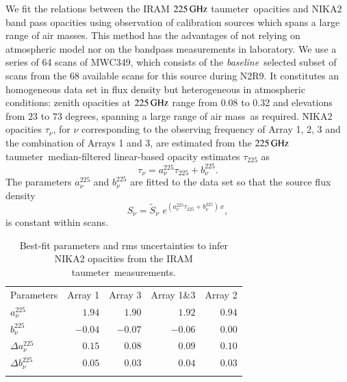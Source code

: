 \documentclass[traditionalabstract]{aa}
\newcommand{\baseline}{\emph{baseline}}
\newcommand{\taunu}{\tau_{\nu}}
\newcommand{\taumeter}{taumeter}
\newcommand{\airmass}{air mass}
\newcommand{\lp}[1]{#1}
\begin{document}
We fit the relations between the IRAM
$225\,\rm{GHz}$ \taumeter\ opacities and NIKA2 band pass opacities using
observation of calibration sources which spans a large range of air
masses. This method has the advantages of not relying on atmospheric
model nor on the bandpass measurements in laboratory.
We use a series of 64 scans of MWC349, which consists of the
\baseline\ selected subset of scans from the 68 available scans for
this source during N2R9.
It constitutes an homogeneous data set in flux density but
heterogeneous in atmospheric conditions: zenith opacities at
$225\,\rm{GHz}$ range from 0.08 to 0.32 and elevations from $23$ to $73$
degrees, spanning a large range of \airmass\ as required.
NIKA2 opacities $\taunu$, for $\nu$ corresponding to the observing
frequency of Array 1, 2, 3 and the combination of Arrays 1 and 3, are estimated
from the $225\,\rm{GHz}$ \taumeter\ median-filtered linear-based opacity
estimates $\tau_{225}$ as
\begin{equation}  
  \tau_\nu =  a_\nu^{225}\tau_{225} + b_\nu^{225}.
  \label{eq:taumeter_model}
\end{equation}
The parameters $a_\nu^{225}$ and $b_\nu^{225}$ are fitted
to the data set so that the source flux density 
\begin{equation}  
  S_\nu = \tilde{S}_\nu\,\, e^{(a_\nu^{225}\tau_{225} + b_\nu^{225}) \, x}, 
  \label{eq:opacorr_taumeter}
\end{equation}
is constant within scans.

\begin{table}[!htbp]
  \begin{center}
    \caption[IRAM \taumeter\ to NIKA2 opacity model]{{\lp Best-fit
    parameters and rms uncertainties to infer NIKA2 opacities from the IRAM \taumeter\ measurements.}}
    \label{tab:tau225-to-taunika}  
    \begin{tabular}{lrrrr}
      \hline
      \hline
      \noalign{\smallskip}
      Parameters & Array 1 & Array 3  & Array 1$\&$3 & Array 2  \\
      \noalign{\smallskip}
      \hline
      \noalign{\smallskip}
      $a_\nu^{225}$         & $1.94$   &  $1.90$ &  $1.92$ & $0.94$ \\
      $b_\nu^{225}$         & $-0.04$  & $-0.07$ & $-0.06$ & $0.00$ \\
      $\Delta a_\nu^{225}$  & $0.15$  & $0.08$  &  $0.09$ & $0.10$ \\
      $\Delta b_\nu^{225}$  & $0.05$  & $0.03$  & $0.04$ & $0.03$ \\
      \noalign{\smallskip}
      \hline
    \end{tabular}
  \end{center}    
\end{table}
\end{document}
